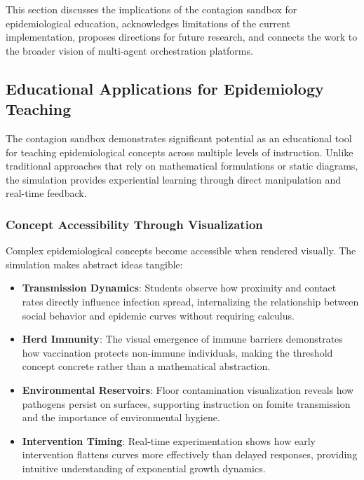 \label{sec:discussion}

This section discusses the implications of the contagion sandbox for epidemiological education, acknowledges limitations of the current implementation, proposes directions for future research, and connects the work to the broader vision of multi-agent orchestration platforms.

\subsection{Educational Applications for Epidemiology Teaching}

The contagion sandbox demonstrates significant potential as an educational tool for teaching epidemiological concepts across multiple levels of instruction. Unlike traditional approaches that rely on mathematical formulations or static diagrams, the simulation provides experiential learning through direct manipulation and real-time feedback.

\subsubsection{Concept Accessibility Through Visualization}

Complex epidemiological concepts become accessible when rendered visually. The simulation makes abstract ideas tangible:

\begin{itemize}
    \item \textbf{Transmission Dynamics}: Students observe how proximity and contact rates directly influence infection spread, internalizing the relationship between social behavior and epidemic curves without requiring calculus.
    
    \item \textbf{Herd Immunity}: The visual emergence of immune barriers demonstrates how vaccination protects non-immune individuals, making the threshold concept concrete rather than a mathematical abstraction.
    
    \item \textbf{Environmental Reservoirs}: Floor contamination visualization reveals how pathogens persist on surfaces, supporting instruction on fomite transmission and the importance of environmental hygiene.
    
    \item \textbf{Intervention Timing}: Real-time experimentation shows how early intervention flattens curves more effectively than delayed responses, providing intuitive understanding of exponential growth dynamics.
\end{itemize}

